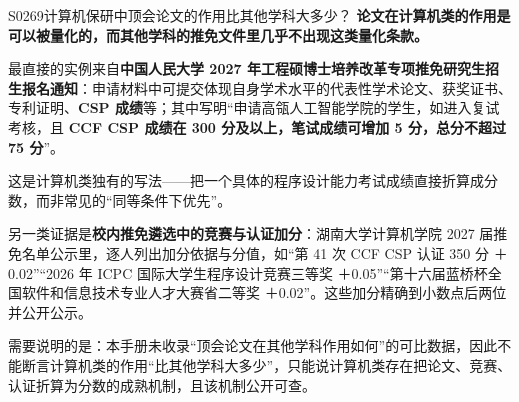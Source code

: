 \begin{qa}{S0269}{计算机保研中顶会论文的作用比其他学科大多少？}
\textbf{论文在计算机类的作用是可以被量化的，而其他学科的推免文件里几乎不出现这类量化条款。}

最直接的实例来自\textbf{中国人民大学 2027 年工程硕博士培养改革专项推免研究生招生报名通知}：申请材料中可提交体现自身学术水平的代表性学术论文、获奖证书、专利证明、\textbf{CSP 成绩}等；其中写明“申请高瓴人工智能学院的学生，如进入复试考核，且 \textbf{CCF CSP 成绩在 300 分及以上，笔试成绩可增加 5 分，总分不超过 75 分}”。

这是计算机类独有的写法——把一个具体的程序设计能力考试成绩直接折算成分数，而非常见的“同等条件下优先”。

另一类证据是\textbf{校内推免遴选中的竞赛与认证加分}：湖南大学计算机学院 2027 届推免名单公示里，逐人列出加分依据与分值，如“第 41 次 CCF CSP 认证 350 分 ＋0.02”“2026 年 ICPC 国际大学生程序设计竞赛三等奖 ＋0.05”“第十六届蓝桥杯全国软件和信息技术专业人才大赛省二等奖 ＋0.02”。这些加分精确到小数点后两位并公开公示。

需要说明的是：本手册未收录“顶会论文在其他学科作用如何”的可比数据，因此不能断言计算机类的作用“比其他学科大多少”，只能说计算机类存在把论文、竞赛、认证折算为分数的成熟机制，且该机制公开可查。
\end{qa}

